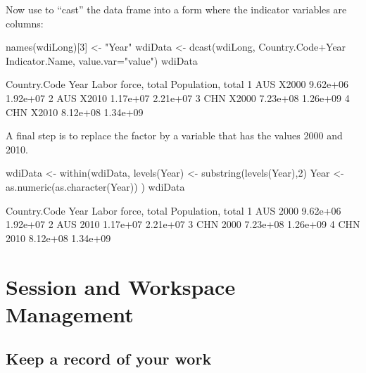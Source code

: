 Now
 use  to ``cast'' the data frame into a form where the
indicator variables are columns:
\begin{fullwidth}

\begin{Schunk}
\begin{Sinput}
names(wdiLong)[3] <- "Year"
wdiData <- dcast(wdiLong,
                 Country.Code+Year ~ Indicator.Name,
                 value.var="value")
wdiData
\end{Sinput}
\begin{Soutput}
  Country.Code  Year Labor force, total Population, total
1          AUS X2000           9.62e+06          1.92e+07
2          AUS X2010           1.17e+07          2.21e+07
3          CHN X2000           7.23e+08          1.26e+09
4          CHN X2010           8.12e+08          1.34e+09
\end{Soutput}
\end{Schunk}

\end{fullwidth}

A final step is to replace the factor  by a variable that
has the values 2000 and 2010.
\begin{fullwidth}

\begin{Schunk}
\begin{Sinput}
wdiData <- within(wdiData, {
   levels(Year) <- substring(levels(Year),2)
   Year <- as.numeric(as.character(Year))
})
wdiData
\end{Sinput}
\begin{Soutput}
  Country.Code Year Labor force, total Population, total
1          AUS 2000           9.62e+06          1.92e+07
2          AUS 2010           1.17e+07          2.21e+07
3          CHN 2000           7.23e+08          1.26e+09
4          CHN 2010           8.12e+08          1.34e+09
\end{Soutput}
\end{Schunk}

\end{fullwidth}

\section{Session and Workspace Management}

\subsection{Keep a record of your work}

